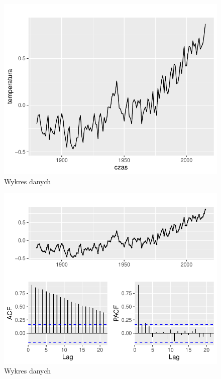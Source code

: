 \documentclass[12pt, a4paper]{article}\usepackage[]{graphicx}\usepackage[]{color}
\makeatletter
\def\maxwidth{ %
  \ifdim\Gin@nat@width>\linewidth
    \linewidth
  \else
    \Gin@nat@width
  \fi
}
\newenvironment{knitrout}{}{} %
\makeatother
\begin{document}
\begin{knitrout}
\color{fgcolor}\begin{figure}[H]

{\centering \includegraphics[width=\maxwidth]{figure/unnamed-chunk-9-1} 

}

\caption[Wykres danych]{Wykres danych}\label{fig:unnamed-chunk-9-1}
\end{figure}

\begin{figure}[H]

{\centering \includegraphics[width=\maxwidth]{figure/unnamed-chunk-9-2} 

}

\caption[Wykres danych]{Wykres danych}\label{fig:unnamed-chunk-9-2}
\end{figure}

\end{knitrout}
\end{document}
